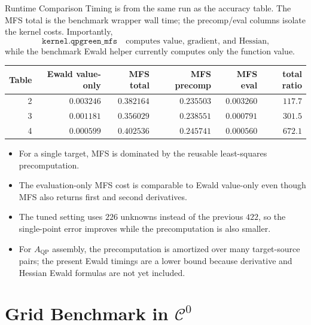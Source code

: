 \documentclass[aspectratio=169]{beamer}
\newcommand{\Czero}{\mathcal C^0}
\begin{document}
\begin{frame}{Runtime Comparison}
  \scriptsize
  Timing is from the same run as the accuracy table.  The MFS total is the
  benchmark wrapper wall time; the precomp/eval columns isolate the kernel
  costs.  Importantly,
  \[
    \texttt{kernel.qpgreen\_mfs}
    \quad\text{computes value, gradient, and Hessian,}
  \]
  while the benchmark Ewald helper currently computes only the function
  value.

  \vspace{0.15em}
  \begin{center}
  \renewcommand{\arraystretch}{1.12}
  \begin{tabular}{rrrrrr}
    \hline
    Table & Ewald value-only & MFS total & MFS precomp & MFS eval & total ratio\\
    \hline
    2 & \(0.003246\) & \(0.382164\) & \(0.235503\) & \(0.003260\) & \(117.7\)\\
    3 & \(0.001181\) & \(0.356029\) & \(0.238551\) & \(0.000791\) & \(301.5\)\\
    4 & \(0.000599\) & \(0.402536\) & \(0.245741\) & \(0.000560\) & \(672.1\)\\
    \hline
  \end{tabular}
  \end{center}

  \vspace{0.25em}
  \begin{itemize}
    \item For a single target, MFS is dominated by the reusable
    least-squares precomputation.
    \item The evaluation-only MFS cost is comparable to Ewald value-only
    even though MFS also returns first and second derivatives.
    \item The tuned setting uses \(226\) unknowns instead of the previous
    \(422\), so the single-point error improves while the precomputation
    is also smaller.
    \item For \(A_{\mathrm{QP}}\) assembly, the precomputation is amortized
    over many target-source pairs; the present Ewald timings are a lower
    bound because derivative and Hessian Ewald formulas are not yet included.
  \end{itemize}
\end{frame}

\section{Grid Benchmark in \texorpdfstring{\(\Czero\)}{C0}}
\end{document}
